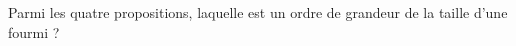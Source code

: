 
Parmi les quatre propositions, laquelle est un ordre de grandeur de la taille d'une fourmi ?

\smallskip
{}
